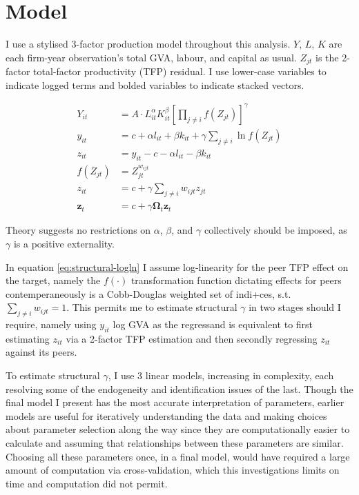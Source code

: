 \section{Model}
I use a stylised 3-factor production model throughout this analysis.
$Y$, $L$, $K$ are each firm-year observation's total GVA, labour, and capital as usual.
$Z_{jt}$ is the 2-factor total-factor productivity (TFP) residual.
I use lower-case variables to indicate logged terms and bolded variables to indicate stacked vectors.

\begin{align}
    Y_{it} &= A \cdot L_{it}^\alpha K_{it}^\beta \left[  \prod_{j\neq i}f(Z_{jt}) \right]^\gamma
    \\
    y_{it} &= c + \alpha l_{it} + \beta k_{it} + \gamma \sum_{j\neq i} \ln f(Z_{jt})
    \\
    z_{it} &= y_{it} - c - \alpha l_{it} - \beta k_{it}
    \\
    \label{eq:structural-logln}
    f(Z_{jt}) &= Z_{jt}^{w_{ijt}}
    \\
    z_{it} &= c + \gamma \sum_{j\neq i} w_{ijt} z_{jt}
    \\
    \mathbf z_t &= c + \gamma \mathbf \Omega_t \mathbf z_t
\end{align}

\par
Theory suggests no restrictions on $\alpha$, $\beta$, and $\gamma$ collectively should be imposed,
as $\gamma$ is a positive externality. 
\par
In equation \ref{eq:structural-logln} I assume log-linearity for the peer TFP effect on the target,
namely the $f(\cdot)$ transformation function dictating effects for peers contemperaneously
is a Cobb-Douglas weighted set of indi+ces, s.t. $\sum_{j\neq i} w_{ijt}=1$.
This permits me to estimate structural $\gamma$ in two stages should I require,
namely using $y_{it}$ log GVA as the regressand is equivalent to
first estimating $z_{it}$ via a 2-factor TFP estimation
and then secondly regressing $z_{it}$ against its peers.
\par
To estimate structural $\gamma$, I use 3 linear models, increasing in complexity,
each resolving some of the endogeneity and identification issues of the last.
Though the final model I present has the most accurate interpretation of parameters,
earlier models are useful for iteratively understanding the data
and making choices about parameter selection along the way
since they are computationally easier to calculate and
assuming that relationships between these parameters are similar.
Choosing all these parameters once, in a final model, would have required
a large amount of computation via cross-validation,
which this investigations limits on time and computation did not permit.

